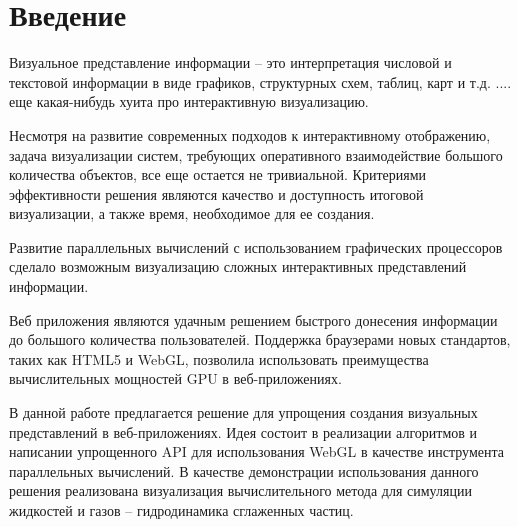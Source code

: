 \newpage
\section*{Введение}



Визуальное представление информации -- это интерпретация числовой и текстовой
информации в виде графиков, структурных схем, таблиц, карт и т.д.
.... еще какая-нибудь хуита про интерактивную визуализацию.

Несмотря на развитие современных подходов к интерактивному отображению, задача
визуализации систем, требующих оперативного взаимодействие большого количества
объектов, все еще остается не тривиальной. Критериями эффективности решения
являются качество и доступность итоговой визуализации, а также время, необходимое
для ее создания.

Развитие параллельных вычислений с использованием графических процессоров сделало 
возможным визуализацию сложных интерактивных представлений информации. 

Веб приложения являются удачным решением быстрого донесения информации до большого
количества пользователей. Поддержка браузерами новых стандартов, таких как HTML5 и WebGL,  
позволила использовать преимущества вычислительных мощностей GPU в веб-приложениях.

В данной работе предлагается решение для упрощения создания визуальных представлений
в веб-приложениях. Идея состоит в реализации алгоритмов и написании упрощенного 
API для использования WebGL в качестве инструмента параллельных вычислений.
В качестве демонстрации использования данного решения реализована визуализация
вычислительного метода для симуляции жидкостей и газов -- гидродинамика сглаженных частиц.

